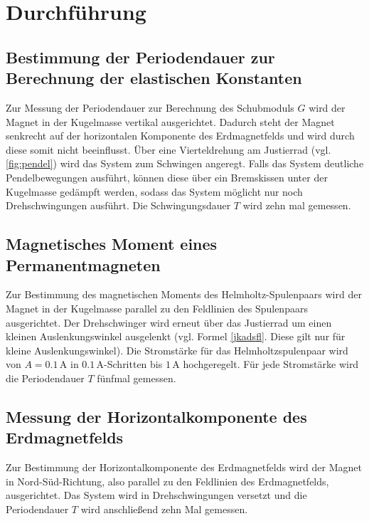 
\section{Durchführung}
\label{sec:Durchführung}
\subsection{Bestimmung der Periodendauer zur Berechnung der elastischen Konstanten}
Zur Messung der Periodendauer zur Berechnung des Schubmoduls $G$ wird der Magnet in der Kugelmasse vertikal ausgerichtet. Dadurch steht der Magnet senkrecht auf der horizontalen Komponente des Erdmagnetfelds und wird durch diese somit nicht beeinflusst.
Über eine Vierteldrehung am Justierrad (vgl. \ref{fig:pendel}) wird das System zum Schwingen angeregt.
Falls das System deutliche Pendelbewegungen ausführt, können diese über ein Bremskissen unter der Kugelmasse gedämpft werden, sodass das System möglicht nur noch Drehschwingungen ausführt.
Die Schwingungsdauer $T$ wird zehn mal gemessen.
\subsection{Magnetisches Moment eines Permanentmagneten}
Zur Bestimmung des magnetischen Moments des Helmholtz-Spulenpaars wird der Magnet in der Kugelmasse parallel zu den Feldlinien des Spulenpaars ausgerichtet.
Der Drehschwinger wird erneut über das Justierrad um einen kleinen Auslenkungswinkel ausgelenkt (vgl. Formel \eqref{jkadsfl}. Diese gilt nur für kleine Auslenkungswinkel).
Die Stromstärke für das Helmholtzspulenpaar wird von $A=0.1\,\si{\ampere}$ in $0.1\,\si{\ampere}$-Schritten bis $1\,\si{\ampere}$ hochgeregelt.
Für jede Stromstärke wird die Periodendauer $T$ fünfmal gemessen. 
\subsection{Messung der Horizontalkomponente des Erdmagnetfelds}
Zur Bestimmung der Horizontalkomponente des Erdmagnetfelds wird der Magnet in Nord-Süd-Richtung, also parallel zu den Feldlinien des Erdmagnetfelds, ausgerichtet.
Das System wird in Drehschwingungen versetzt und die Periodendauer $T$ wird anschließend zehn Mal gemessen.
